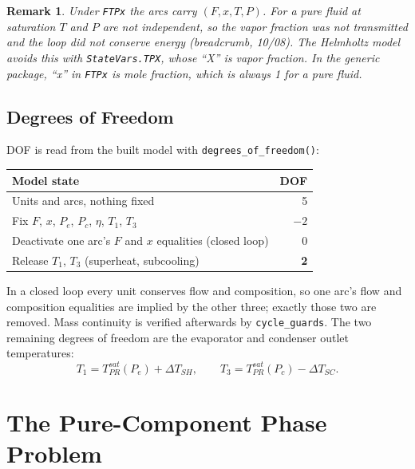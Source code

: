 \documentclass{article}
\newtheorem{remark}{Remark}
\begin{document}
\begin{remark}
Under \texttt{FTPx} the arcs carry $(F,x,T,P)$. For a pure fluid at saturation
$T$ and $P$ are not independent, so the vapor fraction was not transmitted and
the loop did not conserve energy (breadcrumb, 10/08). The Helmholtz model
avoids this with \texttt{StateVars.TPX}, whose ``X'' is vapor fraction. In
the generic package, ``x'' in \texttt{FTPx} is mole fraction, which is always
1 for a pure fluid.
\end{remark}

\subsection{Degrees of Freedom}
DOF is read from the built model with \texttt{degrees\_of\_freedom()}:
\begin{table}[h]
\centering
\begin{tabular}{lr}
\toprule
Model state & DOF \\
\midrule
Units and arcs, nothing fixed & 5 \\
Fix $F$, $x$, $P_e$, $P_c$, $\eta$, $T_1$, $T_3$ & $-2$ \\
Deactivate one arc's $F$ and $x$ equalities (closed loop) & 0 \\
Release $T_1$, $T_3$ (superheat, subcooling) & \textbf{2} \\
\bottomrule
\end{tabular}
\end{table}
In a closed loop every unit conserves flow and composition, so one arc's
flow and composition equalities are implied by the other three; exactly those
two are removed. Mass continuity is verified afterwards by
\texttt{cycle\_guards}. The two remaining degrees of freedom are the
evaporator and condenser outlet temperatures:
\begin{equation}
T_1 = T^{sat}_{PR}(P_e) + \Delta T_{SH}, \qquad
T_3 = T^{sat}_{PR}(P_c) - \Delta T_{SC}.
\end{equation}

\section{The Pure-Component Phase Problem}
\end{document}
